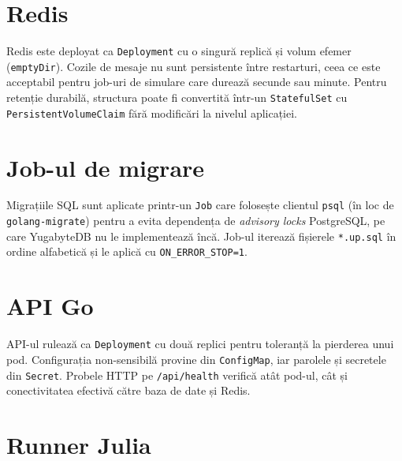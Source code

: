 \section*{Redis}

Redis este deployat ca \texttt{Deployment} cu o singură replică și volum
efemer (\texttt{emptyDir}). Cozile de mesaje nu sunt persistente între
restarturi, ceea ce este acceptabil pentru job-uri de simulare care
durează secunde sau minute. Pentru retenție durabilă, structura poate
fi convertită într-un \texttt{StatefulSet} cu \texttt{PersistentVolumeClaim}
fără modificări la nivelul aplicației.



\section*{Job-ul de migrare}

Migrațiile SQL sunt aplicate printr-un \texttt{Job} care folosește
clientul \texttt{psql} (în loc de \texttt{golang-migrate}) pentru a
evita dependența de \emph{advisory locks} PostgreSQL, pe care YugabyteDB
nu le implementează încă. Job-ul iterează fișierele \texttt{*.up.sql}
în ordine alfabetică și le aplică cu \texttt{ON\_ERROR\_STOP=1}.



\section*{API Go}

API-ul rulează ca \texttt{Deployment} cu două replici pentru toleranță
la pierderea unui pod. Configurația non-sensibilă provine din
\texttt{ConfigMap}, iar parolele și secretele din \texttt{Secret}.
Probele HTTP pe \texttt{/api/health} verifică atât pod-ul, cât și
conectivitatea efectivă către baza de date și Redis.



\section*{Runner Julia}

